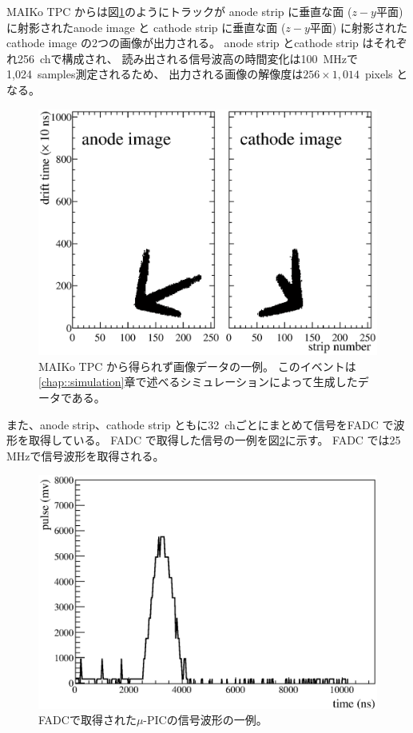 MAIKo TPC からは図\ref{fig::track_demo}のようにトラックが
anode strip に垂直な面 ($z-y$平面) に射影されたanode image と
cathode strip に垂直な面 ($z-y$平面) に射影されたcathode image の2つの画像が出力される。
anode strip とcathode strip はそれぞれ256~chで構成され、
読み出される信号波高の時間変化は100~MHzで1,024~samples測定されるため、
出力される画像の解像度は$256\times1,014$~pixels となる。
\begin{figure}
  \centering
  \includegraphics[clip, width=0.9\columnwidth]{eps/10024_4.eps}
  \caption[MAIKo TPC から得られず画像データの一例。]
          {MAIKo TPC から得られず画像データの一例。
          このイベントは\ref{chap::simulation}章で述べるシミュレーションによって生成したデータである。}
  \label{fig::track_demo}
\end{figure}
また、anode strip、cathode strip ともに32~chごとにまとめて信号をFADC で波形を取得している。
FADC で取得した信号の一例を図\ref{fig::FADC_waveform}に示す。
FADC では25 MHzで信号波形を取得される。
\begin{figure}
  \centering
  \includegraphics[clip, width=0.7\columnwidth]{eps/0101_waveform_8.eps}
  \caption{FADCで取得された$\mu$-PICの信号波形の一例。}
  \label{fig::FADC_waveform}
\end{figure}

